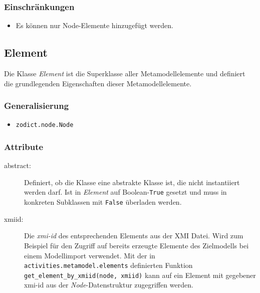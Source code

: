 \subsubsection{Einschränkungen}
\begin{itemize}
\item Es können nur Node-Elemente hinzugefügt werden.
\end{itemize}


\subsection{Element}
Die Klasse \emph{Element} ist die Superklasse aller Metamodellelemente und definiert die grundlegenden Eigenschaften dieser Metamodellelemente.

\subsubsection{Generalisierung}
\begin{itemize}
\item \texttt{zodict.node.Node}
\end{itemize}

\subsubsection{Attribute}
\begin{description}
\item[abstract:] Definiert, ob die Klasse eine abstrakte Klasse ist, die nicht instantiiert werden darf. Ist in \emph{Element} auf Boolean-\texttt{True} gesetzt und muss in konkreten Subklassen mit \texttt{False} überladen werden.
\item[xmiid:] Die \emph{xmi-id} des entsprechenden Elements aus der XMI Datei. Wird zum Beispiel für den Zugriff auf bereits erzeugte Elemente des Zielmodells bei einem Modellimport verwendet. Mit der in \texttt{activities.metamodel.elements} definierten Funktion \texttt{get\_element\_by\_xmiid(node, xmiid)} kann auf ein Element mit gegebener xmi-id aus der \emph{Node}-Datenstruktur zugegriffen werden.
\end{description}

